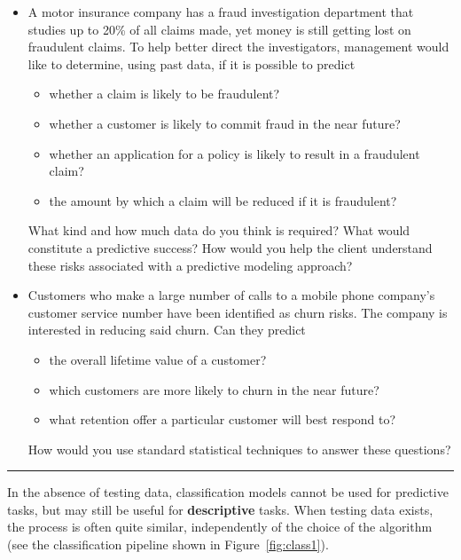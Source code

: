\begin{itemize}[noitemsep]
\item A motor insurance company has a fraud investigation department that studies up to 20\% of all claims made, yet money is still getting lost on fraudulent claims. To help better direct the investigators, management would like to determine, using past data, if it is possible to predict 
\begin{itemize}[noitemsep,topsep=2pt]
\item whether a claim is likely to be fraudulent? 
\item whether a customer is likely to commit fraud in the near future?
\item whether an application for a policy is likely to result in a fraudulent claim?
\item the amount by which a claim will be reduced if it is fraudulent? 
\end{itemize}
What kind and how much data do you think is required? What would constitute a predictive success? How would you help the client understand these risks associated with a predictive modeling approach? 
\item Customers who make a large number of calls to a mobile phone company's customer service number have been identified as churn risks. The company is interested in reducing said churn. Can they predict
\begin{itemize}[noitemsep,topsep=2pt]
\item the overall lifetime value of a customer? 
\item which customers are more likely to churn in the near future? 
\item what retention offer a particular customer will best respond to?
\end{itemize}
How would you use standard statistical techniques to answer these questions?
\end{itemize}
\begin{center}
    \rule{0.5\textwidth}{.4pt}
\end{center}
In the absence of testing data, classification models cannot be used for predictive tasks, but may still be useful for \textbf{descriptive} tasks. When testing data exists, the process is often quite similar, independently of the choice of the algorithm (see the classification pipeline shown in Figure~\ref{fig:class1}). 
